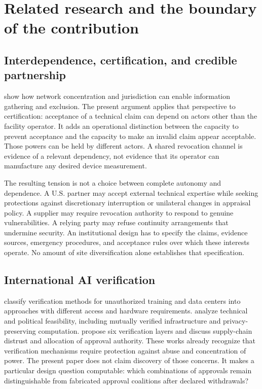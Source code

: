 \documentclass[11pt,letterpaper]{article}
\begin{document}
\section{Related research and the boundary of the contribution}
\subsection{Interdependence, certification, and credible partnership}
\citet{farrell} show how network concentration and jurisdiction can enable information gathering and exclusion. The present argument applies that perspective to certification: acceptance of a technical claim can depend on actors other than the facility operator. It adds an operational distinction between the capacity to prevent acceptance and the capacity to make an invalid claim appear acceptable. Those powers can be held by different actors. A shared revocation channel is evidence of a relevant dependency, not evidence that its operator can manufacture any desired device measurement.

The resulting tension is not a choice between complete autonomy and dependence. A U.S. partner may accept external technical expertise while seeking protections against discretionary interruption or unilateral changes in appraisal policy. A supplier may require revocation authority to respond to genuine vulnerabilities. A relying party may refuse continuity arrangements that undermine security. An institutional design has to specify the claims, evidence sources, emergency procedures, and acceptance rules over which these interests operate. No amount of site diversification alone establishes that specification.

\subsection{International AI verification}
\citet{wasil} classify verification methods for unauthorized training and data centers into approaches with different access and hardware requirements. \citet{harack} analyze technical and political feasibility, including mutually verified infrastructure and privacy-preserving computation. \citet{baker} propose six verification layers and discuss supply-chain distrust and allocation of approval authority. These works already recognize that verification mechanisms require protection against abuse and concentration of power. The present paper does not claim discovery of those concerns. It makes a particular design question computable: which combinations of approvals remain distinguishable from fabricated approval coalitions after declared withdrawals?
\end{document}
